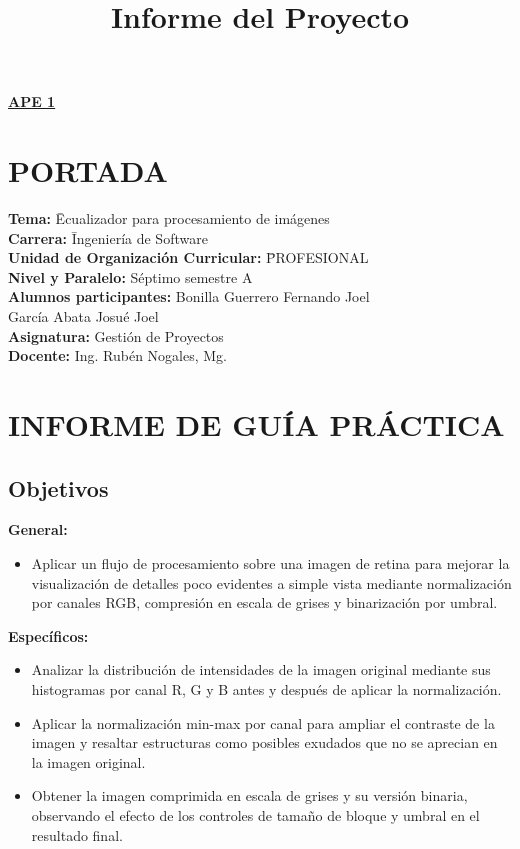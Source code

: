 \documentclass[11pt]{article}
\title{Informe del Proyecto}
\begin{document}
\renewcommand{\thesection}{\Roman{section}}
\begin{center}
    \textbf{\underline{\normalsize APE 1}}
\end{center}

\section{PORTADA}

\begin{tabbing}
    \textbf{Tema:}\hspace{1cm} \= Ecualizador para procesamiento de imágenes \\[0.25em]
    \textbf{Carrera:}\hspace{1cm} \= Ingeniería de Software \\[0.25em]
    \textbf{Unidad de Organización Curricular:} \hspace{1cm} \= PROFESIONAL \\[0.25em]
    \textbf{Nivel y Paralelo:} \> Séptimo semestre A \\[0.25em]
    \textbf{Alumnos participantes:} \> Bonilla Guerrero Fernando Joel \\
    \> García Abata Josué Joel \\[0.25em]
    \textbf{Asignatura:} \> Gestión de Proyectos \\[0.25em]
    \textbf{Docente:} \> Ing. Rubén Nogales, Mg.
\end{tabbing}

\section{INFORME DE GUÍA PRÁCTICA}
\renewcommand{\thesection}{\arabic{section}}

\subsection{Objetivos}
\textbf{General:}
\begin{itemize}
    \item Aplicar un flujo de procesamiento sobre una imagen de retina para mejorar la visualización de detalles poco evidentes a simple vista mediante normalización por canales RGB, compresión en escala de grises y binarización por umbral.
\end{itemize}

\textbf{Específicos:}
\begin{itemize}
    \item Analizar la distribución de intensidades de la imagen original mediante sus histogramas por canal R, G y B antes y después de aplicar la normalización.
    \item Aplicar la normalización min-max por canal para ampliar el contraste de la imagen y resaltar estructuras como posibles exudados que no se aprecian en la imagen original.
    \item Obtener la imagen comprimida en escala de grises y su versión binaria, observando el efecto de los controles de tamaño de bloque y umbral en el resultado final.
\end{itemize}
\end{document}
